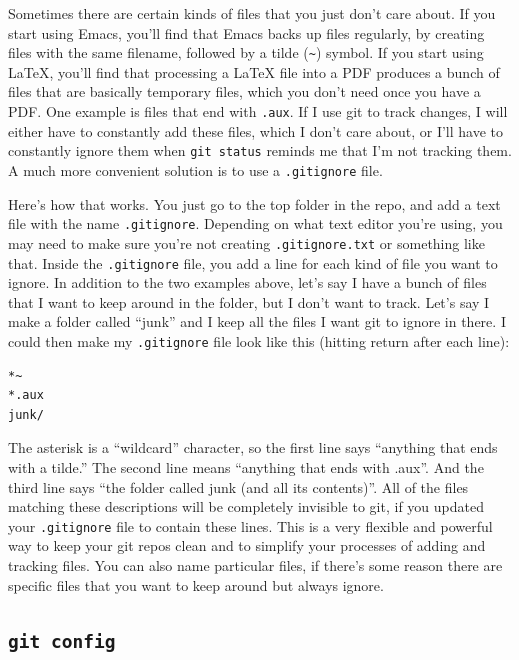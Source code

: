 \documentclass{article}
\begin{document}
Sometimes there are certain kinds of files that you just don't care about.  If you start using Emacs, you'll find that Emacs backs up files regularly, by creating files with the same filename, followed by a tilde (\texttt{\textasciitilde{}}) symbol. If you start using \LaTeX{}, you'll find that processing a \LaTeX{} file into a PDF produces a bunch of files that are basically temporary files, which you don't need once you have a PDF.  One example is files that end with \texttt{.aux}.  If I use git to track changes, I will either have to constantly add these files, which I don't care about, or I'll have to constantly ignore them when \texttt{git status} reminds me that I'm not tracking them.  A much more convenient solution is to use a \texttt{.gitignore} file.  

Here's how that works. You just go to the top folder in the repo, and add a text file with the name \texttt{.gitignore}.  Depending on what text editor you're using, you may need to make sure you're not creating \texttt{.gitignore.txt} or something like that.  Inside the \texttt{.gitignore} file, you add a line for each kind of file you want to ignore.  In addition to the two examples above, let's say I have a bunch of files that I want to keep around in the folder, but I don't want to track. Let's say I make a folder called ``junk'' and I keep all the files I want git to ignore in there.  I could then make my \texttt{.gitignore} file look like this (hitting return after each line):


\begin{verbatim}
*~
*.aux
junk/
\end{verbatim}

The asterisk is a ``wildcard'' character, so the first line says ``anything that ends with a tilde.''  The second line means ``anything that ends with .aux''. And the third line says ``the folder called junk (and all its contents)''.  All of the files matching these descriptions will be completely invisible to git, if you updated your \texttt{.gitignore} file to contain these lines. This is a very flexible and powerful way to keep your git repos clean and to simplify your processes of adding and tracking files.  You can also name particular files, if there's some reason there are specific files that you want to keep around but always ignore.
\subsection{\texttt{git config}}
\label{sec-10-2}
\end{document}
